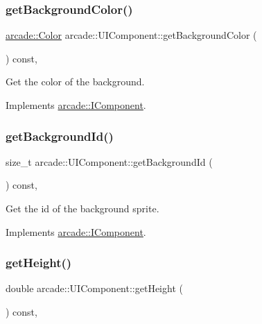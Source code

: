 \subsubsection{\texorpdfstring{get\+Background\+Color()}{getBackgroundColor()}}
{\footnotesize\ttfamily \hyperlink{unionarcade_1_1_color}{arcade\+::\+Color} arcade\+::\+U\+I\+Component\+::get\+Background\+Color (\begin{DoxyParamCaption}{ }\end{DoxyParamCaption}) const\hspace{0.3cm}{\ttfamily [override]}, {\ttfamily [virtual]}}



Get the color of the background. 



Implements \hyperlink{classarcade_1_1_i_component_a99301c61be2a21ef8a274727ba781a00}{arcade\+::\+I\+Component}.

\mbox{\label{classarcade_1_1_u_i_component_a7da87b1ce3bc56dcc6600e1c27e325a6}} 
\subsubsection{\texorpdfstring{get\+Background\+Id()}{getBackgroundId()}}
{\footnotesize\ttfamily size\+\_\+t arcade\+::\+U\+I\+Component\+::get\+Background\+Id (\begin{DoxyParamCaption}{ }\end{DoxyParamCaption}) const\hspace{0.3cm}{\ttfamily [override]}, {\ttfamily [virtual]}}



Get the id of the background sprite. 



Implements \hyperlink{classarcade_1_1_i_component_a7d4c00172b0ba0e3dc63832a9234efbb}{arcade\+::\+I\+Component}.

\mbox{\label{classarcade_1_1_u_i_component_abb02d0b9324eabf8ddf0d1302a0b08f7}} 
\subsubsection{\texorpdfstring{get\+Height()}{getHeight()}}
{\footnotesize\ttfamily double arcade\+::\+U\+I\+Component\+::get\+Height (\begin{DoxyParamCaption}{ }\end{DoxyParamCaption}) const\hspace{0.3cm}{\ttfamily [override]}, {\ttfamily [virtual]}}



